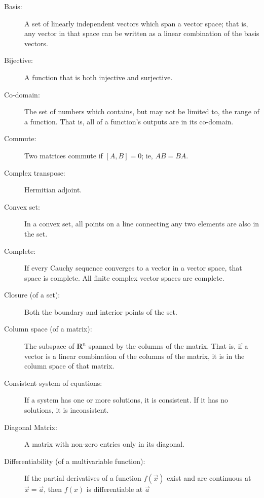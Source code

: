 		\begin{description}			
			\item[Basis:] A set of linearly independent vectors which span a vector space; that is, any vector in that space can be written as a linear combination of the basis vectors.
			
			\item[Bijective:] A function that is both injective and surjective.
			
			\item[Co-domain:] The set of numbers which contains, but may not be limited to, the range of a function. That is, all of a function's outputs are in its co-domain.
			
			\item[Commute:] Two matrices commute if $[A,B] = 0$; ie, $AB = BA$.
			
			\item[Complex transpose:] Hermitian adjoint.
			
			\item[Convex set:] In a convex set, all points on a line connecting any two elements are also in the set.
			
			\item[Complete: ] If every Cauchy sequence converges to a vector in a vector space, that space is complete. All finite complex vector spaces are complete.
			
			\item [Closure (of a set):] Both the boundary and interior points of the set.
			
			\item [Column space (of a matrix):] The subspace of $\mathbf{R}^n$ spanned by the columns of the matrix. That is, if a vector is a linear combination of the columns of the matrix, it is in the column space of that matrix.
			
			\item [Consistent system of equations:] If a system has one or more solutions, it is consistent. If it has no solutions, it is inconsistent.
			
			\item[Diagonal Matrix:] A matrix with non-zero entries only in its diagonal.
			
			\item[Differentiability (of a multivariable function):] If the partial derivatives of a function $f(\vec{x})$ exist and are continuous at $\vec{x} = \vec{a}$, then $f(x)$ is differentiable at $\vec{a}$
			

\end{description}
